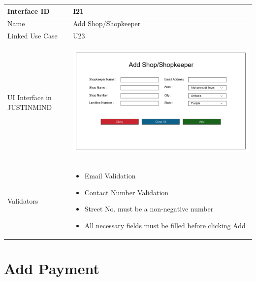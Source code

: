 \documentclass[12pt,a4paper]{report}
\begin{document}
\begin{tabular}{ | m{3cm} | m{12cm}| } \hline

Interface ID &  I21 \\\hline

Name  & Add Shop/Shopkeeper \\ \hline

Linked Use Case & U23 \\ \hline

UI Interface in JUSTINMIND & \begin{center} \includegraphics[scale=0.3]{./User Interface/UI-019 Add ShopAndShopKeeper@1x.png}\end{center}  \\ \hline

Validators & 
\begin{itemize}
\item  Email Validation
\item Contact Number Validation
\item Street No. must be a non-negative number
\item All necessary fields must be filled before clicking Add
 

\end{itemize}
\\ \hline

\end{tabular} 
\section{Add Payment }
\end{document}
